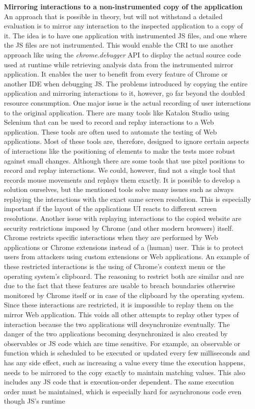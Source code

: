 \noindent\textbf{Mirroring interactions to a non-instrumented copy of the application}\\
An approach that is possible in theory, but will not withstand a detailed evaluation is to mirror any interaction to the inspected application to a copy of it. The idea is to have one application with instrumented JS files, and one where the JS files are not instrumented. This would enable the CRI to use another approach like using the \emph{chrome.debugger} API to display the actual source code used at runtime while retrieving analysis data from the instrumented mirror application. It enables the user to benefit from every feature of Chrome or another IDE when debugging JS. The problems introduced by copying the entire application and mirroring interactions to it, however, go far beyond the doubled resource consumption. One major issue is the actual recording of user interactions to the original application. There are many tools like Katalon Studio \cite{Katalon} using Selenium \cite{Selenium} that can be used to record and replay interactions to a Web application. These tools are often used to automate the testing of Web applications. Most of these tools are, therefore, designed to ignore certain aspects of interactions like the positioning of elements to make the tests more robust against small changes. Although there are some tools that use pixel positions to record and replay interactions. We could, however, find not a single tool that records mouse movements and replays them exactly. It is possible to develop a solution ourselves, but the mentioned tools solve many issues such as always replaying the interactions with the exact same screen resolution. This is especially important if the layout of the applications UI reacts to different screen resolutions. Another issue with replaying interactions to the copied website are security restrictions imposed by Chrome (and other modern browsers) itself. Chrome restricts specific interactions when they are performed by Web applications or Chrome extensions instead of a (human) user. This is to protect users from attackers using custom extensions or Web applications. An example of these restricted interactions is the using of Chrome's context menu or the operating system's clipboard. The reasoning to restrict both are similar and are due to the fact that these features are usable to breach boundaries otherwise monitored by Chrome itself or in case of the clipboard by the operating system. Since these interactions are restricted, it is impossible to replay them on the mirror Web application. This voids all other attempts to replay other types of interaction because the two applications will desynchronize eventually. The danger of the two applications becoming desynchronized is also created by observables or JS code which are time sensitive. For example, an observable or function which is scheduled to be executed or updated every few milliseconds and has any side effect, such as increasing a value every time the execution happens, needs to be mirrored to the copy exactly to maintain matching values. This also includes any JS code that is execution-order dependent. The same execution order must be maintained, which is especially hard for asynchronous code even though JS's runtime 